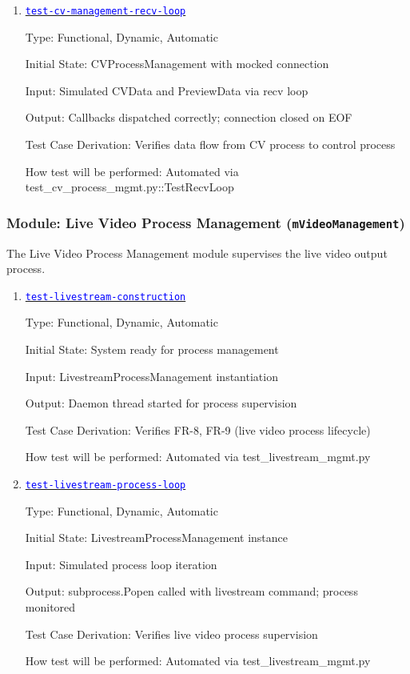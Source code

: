 \documentclass[12pt, titlepage]{article}
\newcommand{\mref}[1]{\texttt{#1}}
\newcommand{\tid}[1]{\hyperlink{tid:#1}{\textcolor{blue}{\texttt{#1}}}}
\begin{document}
\begin{enumerate}
  \item{\tid{test-cv-management-recv-loop}\\}

        Type: Functional, Dynamic, Automatic

        Initial State: CVProcessManagement with mocked connection

        Input: Simulated CVData and PreviewData via recv loop

        Output: Callbacks dispatched correctly; connection closed on EOF

        Test Case Derivation: Verifies data flow from CV process to control process

        How test will be performed: Automated via
        test\_cv\_process\_mgmt.py::TestRecvLoop

\end{enumerate}

\subsubsection{Module: Live Video Process Management (\mref{mVideoManagement})}

The Live Video Process Management module supervises the live video output
process.

\begin{enumerate}

  \item{\tid{test-livestream-construction}\\}

        Type: Functional, Dynamic, Automatic

        Initial State: System ready for process management

        Input: LivestreamProcessManagement instantiation

        Output: Daemon thread started for process supervision

        Test Case Derivation: Verifies FR-8, FR-9 (live video process lifecycle)

        How test will be performed: Automated via test\_livestream\_mgmt.py

  \item{\tid{test-livestream-process-loop}\\}

        Type: Functional, Dynamic, Automatic

        Initial State: LivestreamProcessManagement instance

        Input: Simulated process loop iteration

        Output: subprocess.Popen called with livestream command; process monitored

        Test Case Derivation: Verifies live video process supervision

        How test will be performed: Automated via test\_livestream\_mgmt.py

\end{enumerate}
\end{document}
